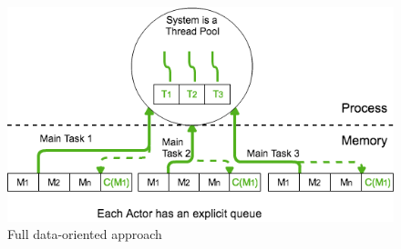 \begin{figure}
	\centering
	\includegraphics[scale=0.47]{solution.png}
	\caption{Full data-oriented approach}
	\label{sol}
\end{figure}

